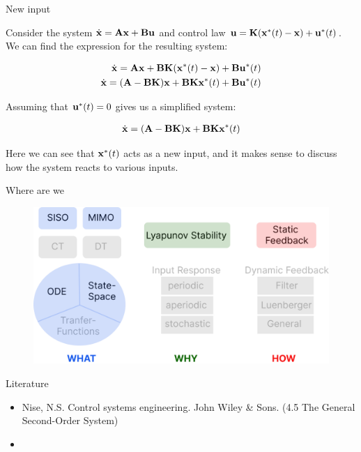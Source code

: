 \documentclass{beamer}
\begin{document}
\begin{frame}{New input}
	\begin{flushleft}
		
		Consider the system $\dot{\mathbf{x}} = \mathbf{A}\mathbf{x} + \mathbf{B}\mathbf{u}$ and control law $\mathbf{u} = \mathbf{K}(\mathbf{x}^*(t) - \mathbf{x}) + \mathbf{u}^*(t)$. We can find the expression for the resulting system:
		
		\begin{align}
			\dot{\mathbf{x}} = \mathbf{A}\mathbf{x} + \mathbf{B}\mathbf{K}(\mathbf{x}^*(t) - \mathbf{x}) + \mathbf{B}\mathbf{u}^*(t) \\
			\dot{\mathbf{x}} = (\mathbf{A}- \mathbf{B}\mathbf{K})\mathbf{x} +\mathbf{B}\mathbf{K}\mathbf{x}^*(t) + \mathbf{B}\mathbf{u}^*(t)
		\end{align}		
		
		Assuming that $\mathbf{u}^*(t) = 0$ gives us a simplified system:
		
		\begin{align}
			\dot{\mathbf{x}} =  (\mathbf{A}- \mathbf{B}\mathbf{K})\mathbf{x} +\mathbf{B}\mathbf{K}\mathbf{x}^*(t)
		\end{align}				
		
		Here we can see that $\mathbf{x}^*(t)$ acts as a new input, and it makes sense to discuss how the system reacts to various inputs.
		
	\end{flushleft}
\end{frame}




\begin{frame}{Where are we}
	
	\begin{figure}
		\centering
		\includegraphics[width=1.00\linewidth]{"Scheme colors"}
	\end{figure}
	

\end{frame}





\begin{frame}{Literature}

\begin{itemize}
	
	
	\item Nise, N.S. Control systems engineering. John Wiley \& Sons. (4.5 The General Second-Order System)	
	
	\item {}
\end{itemize}
\end{frame}




\myqrframe
\end{document}
